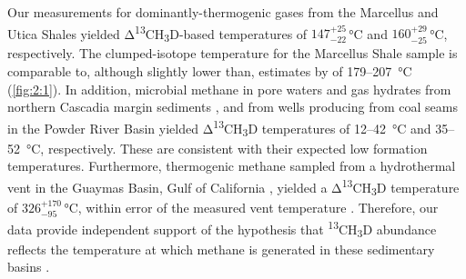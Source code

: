 

Our measurements for dominantly-thermogenic gases from the Marcellus and
Utica Shales \parencite{Baldassare++_2014_AAPGB,Burruss+Laughrey_2010_OG} yielded
Δ\textsuperscript{13}CH\textsubscript{3}D-based temperatures of $147^{+25}_{-22}$\,°C and $160^{+29}_{-25}$\,°C, respectively. The clumped-isotope temperature for the Marcellus
Shale sample is comparable to, although slightly lower than, estimates
by \textcite{Stolper++_2014_S} of 179--207~°C (\autoref{fig:2:1}). In addition,
microbial methane in pore waters and gas hydrates from northern Cascadia
margin sediments \parencite{Pohlman++_2009_EPSL}, and from wells producing from coal seams in
the Powder River Basin \parencite{Flores++_2008_IJCG,Bates++_2011_CG} yielded
Δ\textsuperscript{13}CH\textsubscript{3}D temperatures of 12--42~°C and
35--52~°C, respectively. These are consistent with their expected low
formation temperatures. Furthermore, thermogenic methane sampled from a
hydrothermal vent in the Guaymas Basin, Gulf of California \parencite{Welhan+Lupton_1987_AAPGB},
yielded a Δ\textsuperscript{13}CH\textsubscript{3}D temperature of $326^{+170}_{-95}$\,°C,
within error of the measured vent temperature \parencite[299~°C;][]{Reeves++_2014_PNAS}.
Therefore, our data provide independent support of the hypothesis that
\textsuperscript{13}CH\textsubscript{3}D abundance reflects the
temperature at which methane is generated in these sedimentary basins
\parencite{Stolper++_2014_S}.

